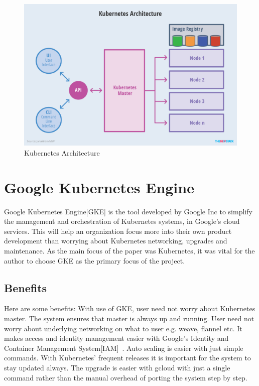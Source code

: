 \begin{figure}[htb]
	\centering\includegraphics[width=\columnwidth]{images/hid_417_Kubernetes-Architecture.png}
  \caption{Kubernetes Architecture~\cite{hid-sp18-417-kubernetes}}
  \label{fig:kube-archtecture}
\end{figure}


\section{ Google Kubernetes Engine}

Google Kubernetes Engine[GKE] is the tool developed by Google Inc to simplify
the management and orchestration of Kubernetes systems, in Google's cloud
services. This will help an organization focus more into their own product
development than worrying about Kubernetes networking, upgrades and
maintenance. As the main focus of the paper was Kubernetes, it was vital for
the author to choose GKE as the primary focus of the project.



\subsection{Benefits}

Here are some benefits: With use of GKE, user need not worry about Kubernetes
master. The system ensures that master is always up and running. User need not
worry about underlying networking on what to user e.g. weave, flannel etc.  It
makes access and identity management easier with Google's Identity and
Container Management System[IAM]~\cite{hid-sp18-417-IAM}. Auto scaling is
easier with just simple commands. With Kubernetes' frequent releases it is
important for the system to stay updated always. The upgrade is easier with
gcloud with just a single command rather than the manual overhead of porting
the system step by step.

